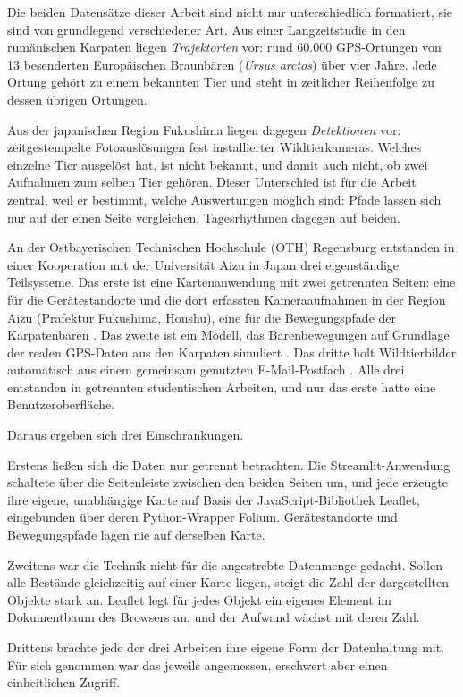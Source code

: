 \documentclass[12pt,a4paper]{report}
\begin{document}
Die beiden Datensätze dieser Arbeit sind nicht nur unterschiedlich formatiert, sie sind von
grundlegend verschiedener Art. Aus einer Langzeitstudie in den rumänischen Karpaten liegen
\emph{Trajektorien} vor: rund 60.000 GPS-Ortungen von 13 besenderten Europäischen
Braunbären (\emph{Ursus arctos}) über vier Jahre. Jede Ortung gehört zu einem bekannten
Tier und steht in zeitlicher Reihenfolge zu dessen übrigen Ortungen.

Aus der japanischen Region Fukushima liegen dagegen \emph{Detektionen} vor: zeitgestempelte
Fotoauslösungen fest installierter Wildtierkameras. Welches einzelne Tier ausgelöst hat, ist
nicht bekannt, und damit auch nicht, ob zwei Aufnahmen zum selben Tier gehören. Dieser
Unterschied ist für die Arbeit zentral, weil er bestimmt, welche Auswertungen möglich sind:
Pfade lassen sich nur auf der einen Seite vergleichen, Tagesrhythmen dagegen auf beiden.

An der Ostbayerischen Technischen Hochschule (OTH) Regensburg entstanden in einer
Kooperation mit der Universität Aizu in Japan drei eigenständige Teilsysteme. Das erste ist
eine Kartenanwendung mit zwei getrennten Seiten: eine für die Gerätestandorte und die dort
erfassten Kameraaufnahmen in der Region Aizu (Präfektur Fukushima, Honshū), eine für die
Bewegungspfade der Karpatenbären \cite{LorenzBA}. Das zweite ist ein Modell, das
Bärenbewegungen auf Grundlage der realen GPS-Daten aus den Karpaten simuliert
\cite{BreuBA}. Das dritte holt Wildtierbilder automatisch aus einem gemeinsam genutzten
E-Mail-Postfach \cite{LelchatBA}. Alle drei entstanden in getrennten studentischen Arbeiten,
und nur das erste hatte eine Benutzeroberfläche.

Daraus ergeben sich drei Einschränkungen.

Erstens ließen sich die Daten nur getrennt betrachten. Die Streamlit-Anwendung schaltete
über die Seitenleiste zwischen den beiden Seiten um, und jede erzeugte ihre eigene,
unabhängige Karte auf Basis der JavaScript-Bibliothek Leaflet, eingebunden über deren
Python-Wrapper Folium. Gerätestandorte und Bewegungspfade lagen nie auf derselben Karte.

Zweitens war die Technik nicht für die angestrebte Datenmenge gedacht. Sollen alle Bestände
gleichzeitig auf einer Karte liegen, steigt die Zahl der dargestellten Objekte stark an.
Leaflet legt für jedes Objekt ein eigenes Element im Dokumentbaum des Browsers an, und der
Aufwand wächst mit deren Zahl.

Drittens brachte jede der drei Arbeiten ihre eigene Form der Datenhaltung mit. Für sich
genommen war das jeweils angemessen, erschwert aber einen einheitlichen Zugriff.
\end{document}
